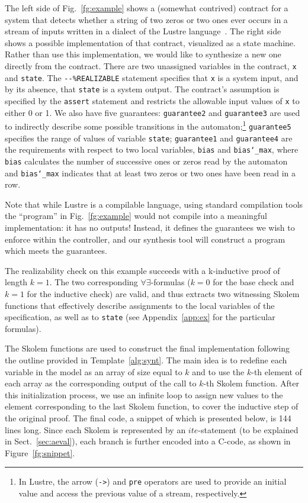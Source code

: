 The left side of Fig.~\ref{fg:example} shows a (somewhat contrived) contract for a system that detects whether a string of two zeros or two ones ever occurs in a stream of inputs written in a dialect of the Lustre language~\cite{lustrev6}.  The right side shows a possible implementation of that contract, visualized as a state machine.
%
Rather than use this implementation, we would like to synthesize a new one directly from the contract. There are two unassigned variables in the contract,
\texttt{x} and \texttt{state}.
The \texttt{{-}{-}\%REALIZABLE} statement specifies that \texttt{x} is a system
input, and by its absence, that \texttt{state} is a system output. The contract's 
assumption is specified by the \texttt{assert} statement and restricts the allowable input values of \texttt{x} to either 0 or 1. We also have five guarantees:
\texttt{guarantee2} and \texttt{guarantee3} are used to indirectly
describe some possible transitions in the automaton;\footnote{In Lustre, the
arrow (\texttt{->}) and \texttt{pre} operators are used to provide an initial value and access the previous value of a stream, respectively.} \texttt{guarantee5} specifies the range of
values of variable \texttt{state};
\texttt{guarantee1} and \texttt{guarantee4} are the requirements with respect to
two local variables, \texttt{bias} and \texttt{bias\char`_max}, where
 \texttt{bias} calculates the number of successive ones or
zeros read by the automaton and \texttt{bias\char`_max} indicates that at least two zeros or two ones have been read in a row.

Note that while Lustre is a compilable language, using standard compilation tools the ``program'' in Fig.~\ref{fg:example} would not compile into a meaningful implementation: it has no outputs!  Instead, it defines the guarantees we wish to enforce within the controller, and our synthesis tool will construct a program which meets the guarantees.

The realizability check on this example succeeds with a k-inductive
proof of length $k = 1$. The two corresponding
$\forall\exists$-formulas ($k=0$ for the base check and $k=1$ for the
inductive check) are valid, and thus \aeval extracts two witnessing
Skolem functions that effectively describe assignments to the local
variables of the specification, as well as to \texttt{state} (see
Appendix~\ref{app:ex} for the particular formulas).

The Skolem functions are used to construct the final implementation
following the outline provided in Template~\ref{alg:synt}.
The main idea is to redefine each variable in the model
as an array of size equal to $k$ and
to use the $k$-th element of each array as the corresponding output of the call
to $k$-th Skolem function. After this initialization process, we use an infinite
loop to assign new values to the element corresponding to the last Skolem
function, to cover the inductive step of the original proof. The final code, a
snippet of which is presented below, is 144 lines long.
Since each Skolem is represented by an $\mathit{ite}$-statement (to be explained
in Sect.~\ref{sec:aeval}), each branch is further encoded into a C-code, as
shown in Figure~\ref{fg:snippet}.

